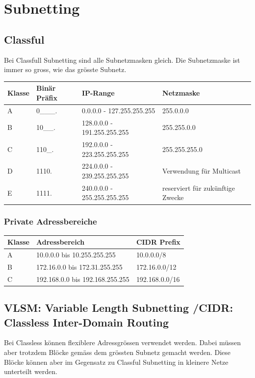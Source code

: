 \section{Subnetting}	
\subsection{Classful}
Bei Classfull Subnetting sind alle Subnetzmasken gleich. Die Subnetzmaske ist immer so gross, wie das grösste Subnetz. \\
\begin{tabu} to \linewidth {|l|l|X|X|}
	\hline
	Klasse 	& Binär Präfix & IP-Range & Netzmaske\\ 
	\hline\hline
	A 		& 0\_\_\_.	& 0.0.0.0 - 127.255.255.255 	& 255.0.0.0  \\ 
	\hline
	B 		& 10\_\_.	& 128.0.0.0 - 191.255.255.255 	& 255.255.0.0 \\ 
	\hline
	C 		& 110\_.	&  192.0.0.0 - 223.255.255.255 	& 255.255.255.0\\ 
	\hline
	D 		& 1110.		& 224.0.0.0 - 239.255.255.255 	& Verwendung für Multicast  \\ 
	\hline
	E 		& 1111.		& 240.0.0.0 - 255.255.255.255 	& reserviert für zukünftige Zwecke  \\ 
	\hline
\end{tabu}

\subsubsection{Private Adressbereiche}
\begin{tabu} to \linewidth {|X|X|X|}
	\hline
	Klasse 	& Adressbereich & CIDR Prefix \\ 
	\hline\hline
	A		& 10.0.0.0 bis 10.255.255.255	& 10.0.0.0/8 \\ 
	\hline
	B		&  172.16.0.0 bis 172.31.255.255 		& 172.16.0.0/12 \\ 
	\hline
	C		& 192.168.0.0 bis 192.168.255.255	& 192.168.0.0/16\\ 
	\hline
\end{tabu}

\subsection{VLSM: Variable Length Subnetting /CIDR: Classless Inter-Domain Routing}
Bei Classless können flexiblere Adressgrössen verwendet werden. Dabei müssen aber trotzdem Blöcke gemäss dem grössten Subnetz gemacht werden. Diese Blöcke können aber im Gegensatz zu Classful Subnetting in kleinere Netze unterteilt werden. 

